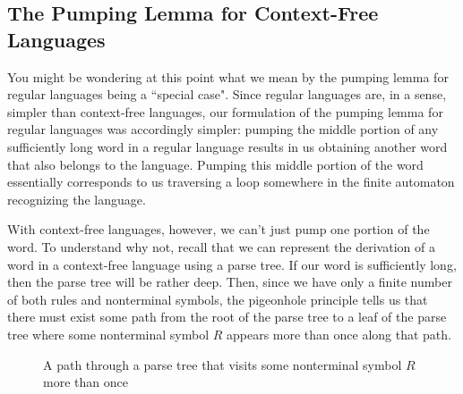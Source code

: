\subsection{The Pumping Lemma for Context-Free Languages}

You might be wondering at this point what we mean by the pumping lemma for regular languages being a ``special case". Since regular languages are, in a sense, simpler than context-free languages, our formulation of the pumping lemma for regular languages was accordingly simpler: pumping the middle portion of any sufficiently long word in a regular language results in us obtaining another word that also belongs to the language. Pumping this middle portion of the word essentially corresponds to us traversing a loop somewhere in the finite automaton recognizing the language.

With context-free languages, however, we can't just pump one portion of the word. To understand why not, recall that we can represent the derivation of a word in a context-free language using a parse tree. If our word is sufficiently long, then the parse tree will be rather deep. Then, since we have only a finite number of both rules and nonterminal symbols, the pigeonhole principle tells us that there must exist some path from the root of the parse tree to a leaf of the parse tree where some nonterminal symbol $R$ appears more than once along that path.

\begin{figure}
\centering
{}
\caption{A path through a parse tree that visits some nonterminal symbol $R$ more than once}
\label{fig:pumpingparsetree}
\end{figure}

